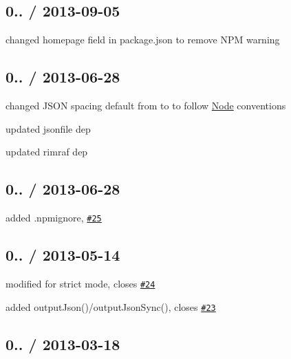 \subsection*{0.. / 2013-\/09-\/05 }


\begin{DoxyItemize}
\item changed {\ttfamily homepage} field in package.\+json to remove N\+PM warning
\end{DoxyItemize}

\subsection*{0.. / 2013-\/06-\/28 }


\begin{DoxyItemize}
\item changed J\+S\+ON spacing default from {} to {} to follow \mbox{\hyperlink{classNode}{Node}} conventions
\item updated {\ttfamily jsonfile} dep
\item updated {\ttfamily rimraf} dep
\end{DoxyItemize}

\subsection*{0.. / 2013-\/06-\/28 }


\begin{DoxyItemize}
\item added .npmignore, \href{https://github.com/jprichardson/node-fs-extra/pull/25}{\tt \#25}
\end{DoxyItemize}

\subsection*{0.. / 2013-\/05-\/14 }


\begin{DoxyItemize}
\item modified for {\ttfamily strict} mode, closes \href{https://github.com/jprichardson/node-fs-extra/issues/24}{\tt \#24}
\item added {\ttfamily output\+Json()/output\+Json\+Sync()}, closes \href{https://github.com/jprichardson/node-fs-extra/issues/23}{\tt \#23}
\end{DoxyItemize}

\subsection*{0.. / 2013-\/03-\/18 }


